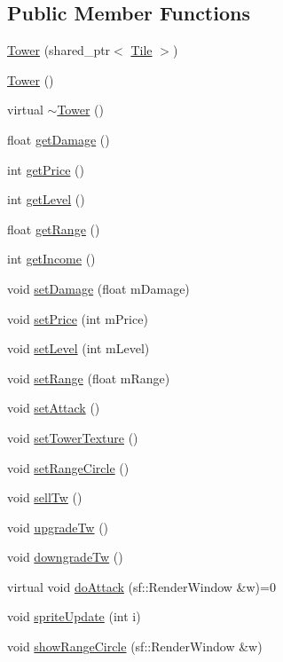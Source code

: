 \subsection*{Public Member Functions}
\begin{DoxyCompactItemize}
\item 
\hyperlink{class_tower_a2fd91cfd06bdbb8c5e26b3d5e30770d8}{Tower} (shared\+\_\+ptr$<$ \hyperlink{class_tile}{Tile} $>$)
\item 
\hyperlink{class_tower_a1b785dc1e9fb979a10620ca183b5761d}{Tower} ()
\item 
virtual \hyperlink{class_tower_a96972da33c287758c036c944eccdc5fe}{$\sim$\+Tower} ()
\item 
float \hyperlink{class_tower_acdcf79c9b6c65a9e5134ec249bf6bd4a}{get\+Damage} ()
\item 
int \hyperlink{class_tower_a3b495235e7ca4a76c858d62ba1775aac}{get\+Price} ()
\item 
int \hyperlink{class_tower_ad1fe459e4a6e4a8a6976001ea53a06a7}{get\+Level} ()
\item 
float \hyperlink{class_tower_abbb4fe2239e90f18095e79680dbfd63c}{get\+Range} ()
\item 
int \hyperlink{class_tower_ad8049d4e63bd6b86e962d022df7d05d1}{get\+Income} ()
\item 
void \hyperlink{class_tower_adb91589e341ed1408649ed2310da301b}{set\+Damage} (float m\+Damage)
\item 
void \hyperlink{class_tower_a3ebb2953cea4fb88b0d7f50124f022c2}{set\+Price} (int m\+Price)
\item 
void \hyperlink{class_tower_aa6325131f3ea5cef244cd6b50e770325}{set\+Level} (int m\+Level)
\item 
void \hyperlink{class_tower_a776ebeb91a1d5060ac415fedb0dda0ce}{set\+Range} (float m\+Range)
\item 
void \hyperlink{class_tower_ad9707bfc7619402f7899e7dfe3246f76}{set\+Attack} ()
\item 
void \hyperlink{class_tower_a4f3edbbfcd0908c398057d2608ca88d9}{set\+Tower\+Texture} ()
\item 
void \hyperlink{class_tower_a46b76511c60eff0e0c0b094bd0a16d34}{set\+Range\+Circle} ()
\item 
void \hyperlink{class_tower_a745854abfacb9b27ae1c0b8863713283}{sell\+Tw} ()
\item 
void \hyperlink{class_tower_a34ffa45b1ad095499df291fc5b7c8083}{upgrade\+Tw} ()
\item 
void \hyperlink{class_tower_a72a405119bb68e7169a688e987aeaa70}{downgrade\+Tw} ()
\item 
virtual void \hyperlink{class_tower_a24f01544e308e4b23650779867d54bf8}{do\+Attack} (sf\+::\+Render\+Window \&w)=0
\item 
void \hyperlink{class_tower_af1ab9b841310f9cfb929311c20feb337}{sprite\+Update} (int i)
\item 
void \hyperlink{class_tower_a830f388d79414d79f0eb141f53515c49}{show\+Range\+Circle} (sf\+::\+Render\+Window \&w)
\end{DoxyCompactItemize}
